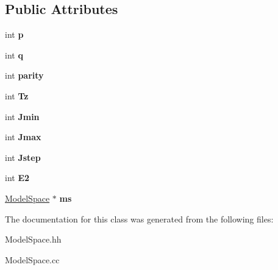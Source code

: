 \subsection*{Public Attributes}
\begin{DoxyCompactItemize}
\item 
\hypertarget{classKet_a3120fbd6d28583a0e06d6426e0e69c83}{int {\bfseries p}}\label{classKet_a3120fbd6d28583a0e06d6426e0e69c83}

\item 
\hypertarget{classKet_afd050bca27dacccd2637266804b4d710}{int {\bfseries q}}\label{classKet_afd050bca27dacccd2637266804b4d710}

\item 
\hypertarget{classKet_a4a0681d5510440adda8a1b8381cf9152}{int {\bfseries parity}}\label{classKet_a4a0681d5510440adda8a1b8381cf9152}

\item 
\hypertarget{classKet_ab5dfa76647fc103d1c97ae349a6353e7}{int {\bfseries Tz}}\label{classKet_ab5dfa76647fc103d1c97ae349a6353e7}

\item 
\hypertarget{classKet_ae042513fd7d35c7edd185d86ef961a00}{int {\bfseries Jmin}}\label{classKet_ae042513fd7d35c7edd185d86ef961a00}

\item 
\hypertarget{classKet_a9ef8bcb06beb06198fc12d194e7a379e}{int {\bfseries Jmax}}\label{classKet_a9ef8bcb06beb06198fc12d194e7a379e}

\item 
\hypertarget{classKet_a81376ef212f38628ad2aa913825052f3}{int {\bfseries Jstep}}\label{classKet_a81376ef212f38628ad2aa913825052f3}

\item 
\hypertarget{classKet_af0cd4574c48941fb396ef7a2e467cc90}{int {\bfseries E2}}\label{classKet_af0cd4574c48941fb396ef7a2e467cc90}

\item 
\hypertarget{classKet_ab9e32bf8c16c7ce422e9a1c9ffe2a9fd}{\hyperlink{classModelSpace}{Model\-Space} $\ast$ {\bfseries ms}}\label{classKet_ab9e32bf8c16c7ce422e9a1c9ffe2a9fd}

\end{DoxyCompactItemize}


The documentation for this class was generated from the following files\-:\begin{DoxyCompactItemize}
\item 
Model\-Space.\-hh\item 
Model\-Space.\-cc\end{DoxyCompactItemize}
